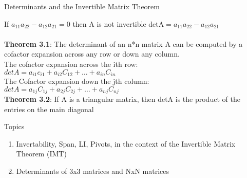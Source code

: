 \documentclass[a4paper, 12pt]{article}
\begin{document}
\begin{section}{Determinants and the Invertible Matrix Theorem}
\begin{subsection}
If $a_{11}a_{22}-a_{12}a_{21}=0$ then A is not invertible
detA$=a_{11}a_{22}-a_{12}a_{21}$
\\
\\ \textbf{Theorem 3.1}: The determinant of an n*n matrix A can be
computed by a cofactor expansion across any row or down any column.
\\ The cofactor expansion across the ith row:\\
$detA=a_{i1}c_{i1}+a_{i2}C_{12}+\dots+a_{in}C_{in}$\\
The Cofactor expansion down the jth column:\\
$detA=a_{1j}C_{1j}+a_{2j}C_{2j}+\dots+a_{nj}C_{nj}$
\\
\textbf{Theorem 3.2}: If A is a triangular matrix, then detA is the 
product of the entries on the main diagonal
\end{subsection}
\begin{subsection}{Topics}
\begin{enumerate}
\item{Invertability, Span, LI, Pivots, in the context of the
	Invertible Matrix Theorem (IMT)}
\item{Determinants of 3x3 matrices and NxN matrices}
\end{enumerate}
\end{subsection}


\end{section}
\end{document}
